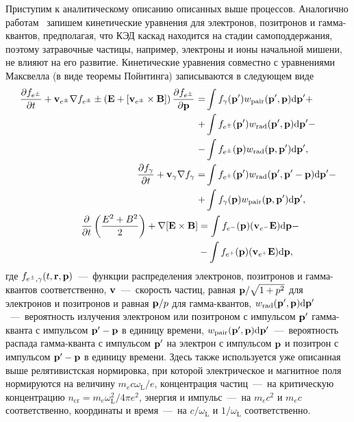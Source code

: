 Приступим к аналитическому описанию описанных выше процессов.
Аналогично работам~\cite{nerush2011analytical, elkina2011qed} запишем кинетические уравнения для электронов, позитронов и гамма-квантов, предполагая, что КЭД каскад находится на стадии самоподдержания, поэтому затравочные частицы, например, электроны и ионы начальной мишени, не влияют на его развитие.
Кинетические уравнения совместно с уравнениями Максвелла (в виде теоремы Пойнтинга) записываются в следующем виде
\begin{align}
    \label{eq:ch2/Boltzman1}
    \pdv{f_{e^\pm}}{t} +  \vb{v}_{e^\pm} \nabla f_{e^\pm} \pm \left( \vb{E} + [\vb{v}_{e^\pm} \times \vb{B}] \right) \pdv{ f_{e^\pm}}{ \vb{p}} \ &
    \begin{aligned}[t]
        = & \int f_\gamma(\vb{p'}) w_\mathrm{pair}(\vb{p', p}) \dd\vb{p'} + \\
        + & \int f_{e^\pm}(\vb{p'}) w_\mathrm{rad}(\vb{p', p}) \dd\vb{p'} - \\
        - & \int f_{e^\pm}(\vb{p}) w_\mathrm{rad}(\vb{p, p'}) \dd\vb{p'}  ,
    \end{aligned} \\
    \label{eq:ch2/Boltzman2}
    \pdv{f_\gamma}{t} + \vb{v}_\gamma\nabla f_\gamma \ &
    \begin{aligned}[t]
        = &\int  f_{e^\pm}(\vb{p'}) w_\mathrm{rad}(\vb{p', p'-p}) \dd\vb{p'} - \\ 
        + &\int f_\gamma(\vb{p}) w_\mathrm{pair}(\vb{p, p'}) \dd\vb{p'} ,
    \end{aligned} \\
    \label{eq:ch2/Max1}
    \pdv{}{t}\left( \frac{E^2 + B^2}{2} \right) + \nabla [\vb{E}\times\vb{B}] &= \int f_{e^-}(\vb{p}) (\vb{v}_{e^-} \vb{E}) \dd\vb{p} - \\
    &- \int f_{e^+}(\vb{p}) (\vb{v}_{e^+}\vb{E}) \dd\vb{p} ,
\end{align}
где $f_{e^\pm,\gamma}(t,\vb{r,p})$~---~функции распределения электронов, позитронов и гамма-квантов соответственно, $\vb{v}$~---~скорость частиц, равная $\vb{p}/\sqrt{1+p^2}$ для электронов и позитронов и равная $\vb{p}/p$ для гамма-квантов, $w_\mathrm{rad}(\vb{p', p})\dd\vb{p'}$~---~вероятность излучения электроном или позитроном с импульсом $\vb{p'}$ гамма-кванта с импульсом $\vb{p'-p}$ в единицу времени, $w_\mathrm{pair}(\vb{p', p})\dd\vb{p'}$~---~вероятность распада гамма-кванта с импульсом $\vb{p'}$ на электрон с импульсом $\vb{p}$ и позитрон с импульсом $\vb{p'-p}$ в единицу времени.
Здесь также используется уже описанная выше релятивистская нормировка, при которой электрическое и магнитное поля нормируются на величину $m_ec\omega_\mathrm{L}/e$, концентрация частиц~---~на критическую концентрацию $n_\mathrm{cr}=m_e\omega_\mathrm{L}^2/4\pi e^2$, энергия и импульс~---~на $m_e c^2$ и $m_e c$ соответственно, координаты и время~---~на $c/\omega_\mathrm{L}$ и $1/\omega_\mathrm{L}$ соответственно.

